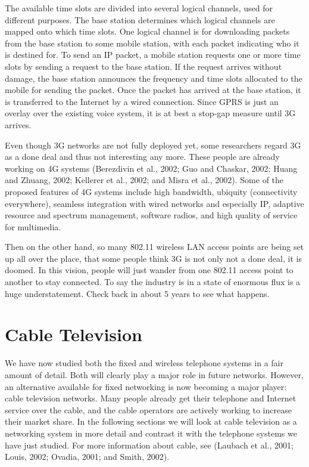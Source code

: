 \documentclass[b5paper,11pt]{memoir}
\begin{document}
The available time slots are divided into several logical channels, used
for different purposes. The base station determines which logical
channels are mapped onto which time slots. One logical channel is for
downloading packets from the base station to some mobile station, with
each packet indicating who it is destined for. To send an IP packet, a
mobile station requests one or more time slots by sending a request to
the base station. If the request arrives without damage, the base
station announces the frequency and time slots allocated to the mobile
for sending the packet. Once the packet has arrived at the base station,
it is transferred to the Internet by a wired connection. Since GPRS is
just an overlay over the existing voice system, it is at best a stop-gap
measure until 3G arrives.

Even though 3G networks are not fully deployed yet, some researchers
regard 3G as a done deal and thus not interesting any more. These people
are already working on 4G systems (Berezdivin et al., 2002; Guo and
Chaskar, 2002; Huang and Zhuang, 2002; Kellerer et al., 2002; and Misra
et al., 2002). Some of the proposed features of 4G systems include high
bandwidth, ubiquity (connectivity everywhere), seamless integration with
wired networks and especially IP, adaptive resource and spectrum
management, software radios, and high quality of service for multimedia.

Then on the other hand, so many 802.11 wireless LAN access points are
being set up all over the place, that some people think 3G is not only
not a done deal, it is doomed. In this vision, people will just wander
from one 802.11 access point to another to stay connected. To say the
industry is in a state of enormous flux is a huge understatement. Check
back in about 5 years to see what happens.




\section{Cable Television}

We have now studied both the fixed and wireless telephone systems in a
fair amount of detail. Both will clearly play a major role in future
networks. However, an alternative available for fixed networking is now
becoming a major player: cable television networks. Many people already
get their telephone and Internet service over the cable, and the cable
operators are actively working to increase their market share. In the
following sections we will look at cable television as a networking
system in more detail and contrast it with the telephone systems we have
just studied. For more information about cable, see (Laubach et al.,
2001; Louis, 2002; Ovadia, 2001; and Smith, 2002).
\end{document}
